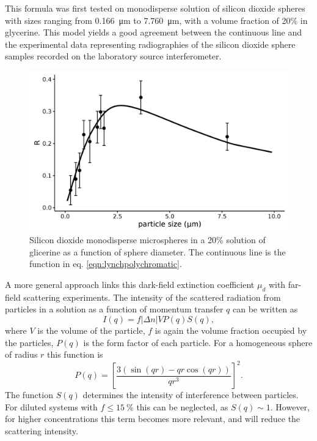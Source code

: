 This formula was first tested on monodisperse solution of silicon dioxide
spheres with sizes ranging from \SI{0.166}{\micro\meter} to
\SI{7.760}{\micro\meter}, with a volume fraction of 20\%
in glycerine. This model yields a good agreement between the continuous line
and the experimental data representing radiographies of the silicon dioxide
sphere samples recorded on the laboratory source interferometer.
\begin{figure}[h!]
\begin{center}
\includegraphics[width=0.70\columnwidth]{gfx/lung-paper-figures/summary/summary}
\caption{{Silicon dioxide monodisperse microspheres in a 20\% solution of
glicerine as a function of sphere diameter. The continuous line is the
function in eq. {\ref{eqn:lynchpolychromatic}}.
{\label{725462}}%
}}
\end{center}
\end{figure}

A more general approach links this dark-field extinction coefficient
$\mu_d$ with far-field scattering experiments.
The intensity of the scattered radiation from particles in a solution as a
function of momentum transfer $q$ can be written as~\parencite{PEDERSEN1997171,Gkoumas2016}
\begin{equation}
    I(q) = f|\Delta n| V P(q) S(q),
    \label{eq:scattering.intensity}
\end{equation}
where $V$ is the volume of the particle, $f$ is again the volume fraction
occupied by the particles, $P(q)$ is the form factor of each particle. For a
homogeneous sphere of radius $r$ this function is~\parencite{PEDERSEN1997171}
\begin{equation}
    P(q) = \left[\frac{3(\sin(qr) - qr\cos(qr))}{qr^3}\right]^2.
    \label{eq:sphere.form.factor}
\end{equation}
The function $S(q)$ determines the intensity of interference between
particles. For diluted systems with $f \leq \SI{15}{\percent}$ this can
be neglected, as $S(q) \sim 1$. However, for higher concentrations this term
becomes more relevant, and will reduce the scattering intensity.

